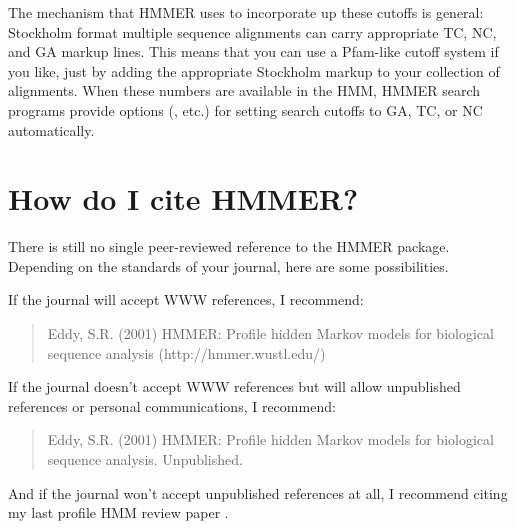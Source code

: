 The mechanism that HMMER uses to incorporate up these cutoffs is
general: Stockholm format multiple sequence alignments can carry
appropriate TC, NC, and GA markup lines. This means that you can use a
Pfam-like cutoff system if you like, just by adding the appropriate
Stockholm markup to your collection of alignments. When these numbers
are available in the HMM, HMMER search programs provide options
(, etc.) for setting search cutoffs to GA, TC, or NC
automatically.

\section{How do I cite HMMER?}

There is still no single peer-reviewed reference to the HMMER
package. Depending on the standards of your journal, here are
some possibilities.

If the journal will accept WWW references, I recommend:

\begin{quote}
Eddy, S.R. (2001) HMMER: Profile hidden Markov models for
biological sequence analysis (http://hmmer.wustl.edu/)
\end{quote}

If the journal doesn't accept WWW references but will allow
unpublished references or personal communications, I recommend:

\begin{quote}
Eddy, S.R. (2001) HMMER: Profile hidden Markov models for
biological sequence analysis. Unpublished.
\end{quote}

And if the journal won't accept unpublished references at all, I
recommend citing my last profile HMM review paper \cite{Eddy98}.

